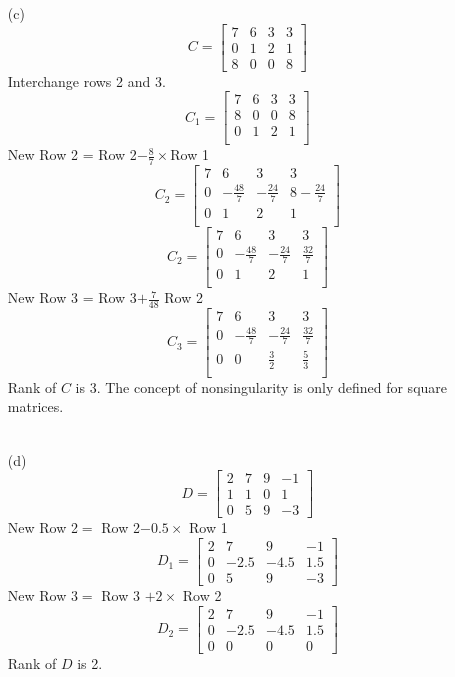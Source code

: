 \documentclass{./../../Latex/homework}
\begin{document}
\begin{enumerate}
\begin{enumerate}
\item[(c)] $$
C =\left[\begin{array}{llll}
7 & 6 & 3 & 3 \\
0 & 1 & 2 & 1 \\
8 & 0 & 0 & 8
\end{array}\right]
$$ 
Interchange rows 2 and 3.
$$
C_1 =\left[\begin{array}{rrrr}
7 & 6 & 3 & 3 \\
8 & 0 & 0 & 8 \\
0 & 1 & 2 & 1 \\
\end{array}\right]
$$ 
New Row 2 = Row 2$-\frac{8}{7} \times$Row 1
\[
C_2 =\left[\begin{array}{rrrr}
7 & 6 & 3 & 3 \\
0 & -\frac{48}{7} &  -\frac{24}{7} & 8-\frac{24}{7}  \\
0 & 1 & 2 & 1 \\
\end{array}\right]
\] 
\[
C_2 =\left[\begin{array}{rrrr}
7 & 6 & 3 & 3 \\
0 & -\frac{48}{7} &  -\frac{24}{7} & \frac{32}{7}  \\
0 & 1 & 2 & 1 \\
\end{array}\right]
\]
New Row 3 = Row 3$+\frac{7}{48}$ Row 2
$$
C_3 =\left[\begin{array}{rrrr}
7 & 6 & 3 & 3 \\
0 & -\frac{48}{7} &  -\frac{24}{7} & \frac{32}{7}  \\
0 & 0 & \frac{3}{2} & \frac{5}{3} \\
\end{array}\right]
$$ 
Rank of $C$ is 3. The concept of nonsingularity is only defined for square matrices. \\~\\
 
\item[(d)] $$ D =\left[\begin{array}{rrrr}
2 & 7 & 9 & -1 \\
1 & 1 & 0 & 1 \\
0 & 5 & 9 & -3
\end{array}\right] $$
New Row 2$=$ Row 2$- 0.5 \times$ Row 1
$$ D_1 =\left[\begin{array}{rrrr}
2 & 7 & 9 & -1 \\
0 & -2.5 & -4.5 & 1.5 \\
0 & 5 & 9 & -3
\end{array}\right] $$
New Row 3$=$ Row 3 $+ 2  \times$ Row 2
$$ D_2 =\left[\begin{array}{rrrr}
2 & 7 & 9 & -1 \\
0 & -2.5 & -4.5 & 1.5 \\
0 & 0& 0 & 0
\end{array}\right] $$
Rank of $D$ is 2.
\end{enumerate}


\end{enumerate}
\end{document}
